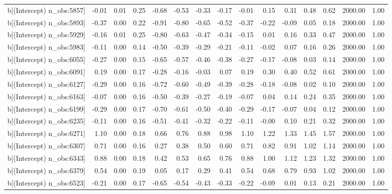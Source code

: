 \begin{table}[ht]
\begin{tabular}{rrrrrrrrrrrrrrr}
  b[(Intercept) n\_obs:5857] & -0.01 & 0.01 & 0.25 & -0.68 & -0.53 & -0.33 & -0.17 & -0.01 & 0.15 & 0.31 & 0.48 & 0.62 & 2000.00 & 1.00 \\ 
  b[(Intercept) n\_obs:5893] & -0.37 & 0.00 & 0.22 & -0.91 & -0.80 & -0.65 & -0.52 & -0.37 & -0.22 & -0.09 & 0.05 & 0.18 & 2000.00 & 1.00 \\ 
  b[(Intercept) n\_obs:5929] & -0.16 & 0.01 & 0.25 & -0.80 & -0.63 & -0.47 & -0.34 & -0.15 & 0.01 & 0.16 & 0.33 & 0.47 & 2000.00 & 1.00 \\ 
  b[(Intercept) n\_obs:5983] & -0.11 & 0.00 & 0.14 & -0.50 & -0.39 & -0.29 & -0.21 & -0.11 & -0.02 & 0.07 & 0.16 & 0.26 & 2000.00 & 1.00 \\ 
  b[(Intercept) n\_obs:6055] & -0.27 & 0.00 & 0.15 & -0.65 & -0.57 & -0.46 & -0.38 & -0.27 & -0.17 & -0.08 & 0.03 & 0.14 & 2000.00 & 1.00 \\ 
  b[(Intercept) n\_obs:6091] & 0.19 & 0.00 & 0.17 & -0.28 & -0.16 & -0.03 & 0.07 & 0.19 & 0.30 & 0.40 & 0.52 & 0.61 & 2000.00 & 1.00 \\ 
  b[(Intercept) n\_obs:6127] & -0.29 & 0.00 & 0.16 & -0.72 & -0.60 & -0.49 & -0.39 & -0.28 & -0.18 & -0.08 & 0.02 & 0.10 & 2000.00 & 1.00 \\ 
  b[(Intercept) n\_obs:6163] & -0.07 & 0.00 & 0.16 & -0.50 & -0.39 & -0.27 & -0.19 & -0.07 & 0.04 & 0.14 & 0.24 & 0.35 & 2000.00 & 1.00 \\ 
  b[(Intercept) n\_obs:6199] & -0.29 & 0.00 & 0.17 & -0.70 & -0.61 & -0.50 & -0.40 & -0.29 & -0.17 & -0.07 & 0.04 & 0.12 & 2000.00 & 1.00 \\ 
  b[(Intercept) n\_obs:6235] & -0.11 & 0.00 & 0.16 & -0.51 & -0.41 & -0.32 & -0.22 & -0.11 & -0.00 & 0.10 & 0.21 & 0.32 & 2000.00 & 1.00 \\ 
  b[(Intercept) n\_obs:6271] & 1.10 & 0.00 & 0.18 & 0.66 & 0.76 & 0.88 & 0.98 & 1.10 & 1.22 & 1.33 & 1.45 & 1.57 & 2000.00 & 1.00 \\ 
  b[(Intercept) n\_obs:6307] & 0.71 & 0.00 & 0.16 & 0.27 & 0.38 & 0.50 & 0.60 & 0.71 & 0.82 & 0.91 & 1.02 & 1.14 & 2000.00 & 1.00 \\ 
  b[(Intercept) n\_obs:6343] & 0.88 & 0.00 & 0.18 & 0.42 & 0.53 & 0.65 & 0.76 & 0.88 & 1.00 & 1.12 & 1.23 & 1.32 & 2000.00 & 1.00 \\ 
  b[(Intercept) n\_obs:6379] & 0.54 & 0.00 & 0.19 & 0.05 & 0.17 & 0.29 & 0.41 & 0.54 & 0.68 & 0.79 & 0.93 & 1.02 & 2000.00 & 1.00 \\ 
  b[(Intercept) n\_obs:6523] & -0.21 & 0.00 & 0.17 & -0.65 & -0.54 & -0.43 & -0.33 & -0.22 & -0.09 & 0.01 & 0.13 & 0.21 & 2000.00 & 1.00 \\ 

\end{tabular}
\end{table}
